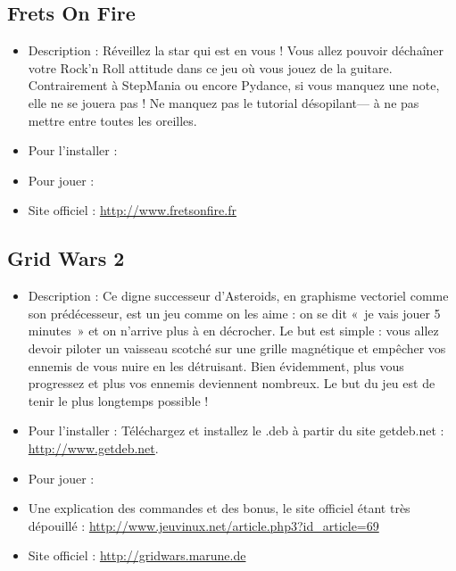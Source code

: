 \subsection{Frets On Fire}
\begin{itemize}
\begingroup
{}
\item Description : Réveillez la star qui est en vous ! Vous allez pouvoir déchaîner votre Rock'n Roll attitude dans ce jeu où vous jouez de la guitare. Contrairement à StepMania ou encore Pydance, si vous manquez une note, elle ne se jouera pas ! Ne manquez pas le tutorial désopilant--- à ne pas mettre entre toutes les oreilles.{\par}
\endgroup
\item Pour l'installer : 
\item Pour jouer : 
\item Site officiel : \url{http://www.fretsonfire.fr}{\par}
\end{itemize}
\subsection{Grid Wars 2}
\begin{itemize}
\begingroup
{}
\item Description : Ce digne successeur d'Asteroids, en graphisme vectoriel comme son prédécesseur, est un jeu comme on les aime : on se dit «~je vais jouer 5 minutes~» et on n'arrive plus à en décrocher. Le but est simple : vous allez devoir piloter un vaisseau scotché sur une grille magnétique et empêcher vos ennemis de vous nuire en les détruisant. Bien évidemment, plus vous progressez et plus vos ennemis deviennent nombreux. Le but du jeu est de tenir le plus longtemps possible !{\par}
\endgroup
\item Pour l'installer : Téléchargez et installez le .deb à partir du site getdeb.net :
\url{http://www.getdeb.net}.{\par}
\item Pour jouer : 
\item Une explication des commandes et des bonus, le site officiel étant très dépouillé : \url{http://www.jeuvinux.net/article.php3?id_article=69}{\par}
\item Site officiel : \url{http://gridwars.marune.de}{\par}
\end{itemize}
